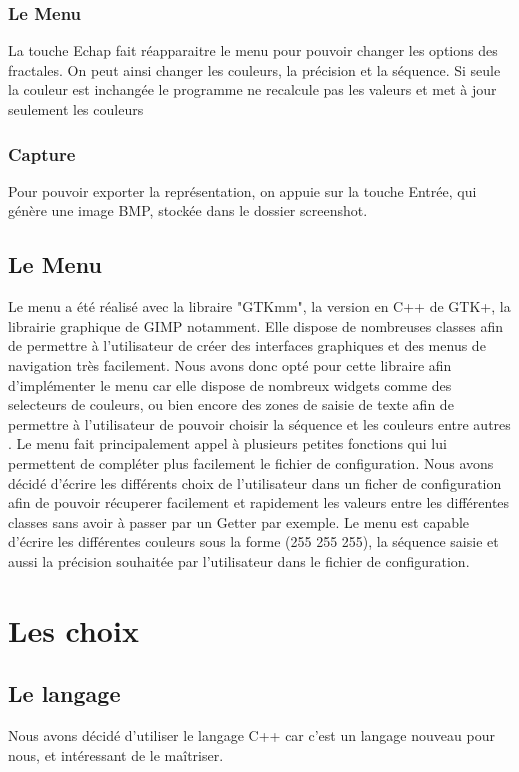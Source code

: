 \documentclass{article}
\begin{document}
	\subsubsection{Le Menu}

	La touche Echap fait réapparaitre le menu pour pouvoir changer les options des fractales.
	On peut ainsi changer les couleurs, la précision et la séquence.
	Si seule la couleur est inchangée le programme ne recalcule pas les valeurs et met à jour seulement les couleurs

	\subsubsection{Capture}

	Pour pouvoir exporter la représentation, on appuie sur la touche Entrée, qui génère une image BMP, stockée dans le dossier screenshot.

	\subsection{Le Menu}
	Le menu a été réalisé avec la libraire "GTKmm", la version en C++ de GTK+, la librairie graphique de GIMP notamment.
	Elle dispose de nombreuses classes afin de permettre à l'utilisateur de créer des interfaces graphiques et des menus de navigation très facilement.
	Nous avons donc opté pour cette libraire afin d'implémenter le menu car elle dispose de nombreux widgets comme des selecteurs de couleurs, ou bien encore des zones de saisie de texte afin de permettre à l'utilisateur de pouvoir choisir la séquence et les couleurs entre autres .
	Le menu fait principalement appel à plusieurs petites fonctions qui lui permettent de compléter plus facilement le fichier de configuration.
	Nous avons décidé d'écrire les différents choix de l'utilisateur dans un ficher de configuration afin de pouvoir récuperer facilement et rapidement les valeurs entre les différentes classes sans avoir à passer par un Getter par exemple.
	Le menu est capable d'écrire les différentes couleurs sous la forme (255 255 255), la séquence saisie et aussi la précision souhaitée par l'utilisateur dans le fichier de configuration.

	\section{Les choix}

	\subsection{Le langage}
	Nous avons décidé d'utiliser le langage C++ car c'est un langage nouveau pour nous, et intéressant de le maîtriser.
\end{document}
